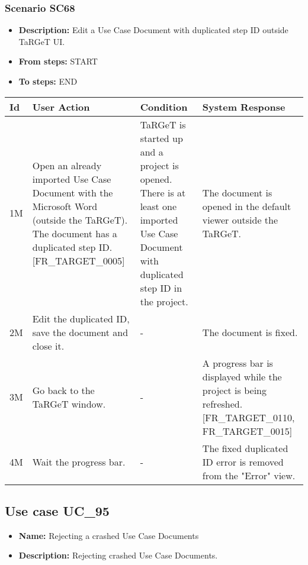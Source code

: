 \documentclass[a4paper,11pt]{article}
\newcommand{\bl}{\\ \hline}
\begin{document}
\subsubsection*{Scenario SC68}
\begin{itemize}
\item {\bf Description:} Edit a Use Case Document with duplicated step ID
					outside TaRGeT UI.
\item {\bf From steps:} START
\item {\bf To steps:} END
\end{itemize}
\begin{tabular}{|p{0.4in}|p{1.5in}|p{1.5in}|p{1.5in}|}
\hline
Id & User Action & Condition & System Response \bl 
1M & Open an already imported Use Case Document with the
						Microsoft Word (outside the TaRGeT). The document has a duplicated
						step ID. [FR_TARGET_0005] & TaRGeT is started up and a project is opened. There is
						at least one imported Use Case Document with duplicated step ID in
						the project. & The document is opened in the default viewer outside the
						TaRGeT.\bl
2M & Edit the duplicated ID, save the document and close it.
					 & - & The document is fixed. \bl
3M & Go back to the TaRGeT window. & - & A progress bar is displayed while the project is being
						refreshed. [FR_TARGET_0110, FR_TARGET_0015]\bl
4M & Wait the progress bar. & - & The fixed duplicated ID error is removed from the "Error"
						view. \bl
\end{tabular}
\subsection*{Use case UC_95}
\begin{itemize}
\item {\bf Name: }Rejecting a crashed Use Case Documents
\item {\bf Description: }Rejecting crashed Use Case Documents.
\end{itemize}
\end{document}
